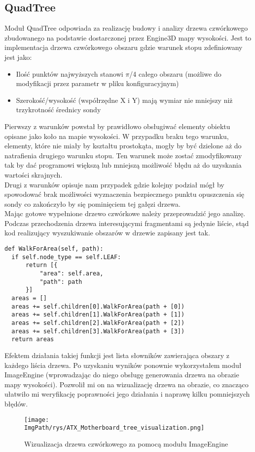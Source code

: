 \documentclass[a4paper,12pt,twoside,openany]{report}
\newcommand{\ImgPath}{.}
\begin{document}
    \subsection{QuadTree}
      Moduł QuadTree odpowiada za realizację budowy i analizy drzewa czwórkowego zbudowanego na podstawie dostarczonej przez 
      Engine3D mapy wysokości. Jest to implementacja drzewa czwórkowego obszaru gdzie warunek stopu zdefiniowany jest jako: 
      \begin{itemize}
        \item Ilość punktów najwyższych stanowi $\pi$/4 całego obszaru (możliwe do modyfikacji przez parametr w pliku konfiguracyjnym)
        \item Szerokość/wysokość (współrzędne X i Y) mają wymiar nie mniejszy niż trzykrotność średnicy sondy
      \end{itemize}
      Pierwszy z warunków powstał by prawidłowo obsługiwać elementy obiektu opisane jako koło na mapie wysokości. W przypadku braku tego warunku, 
      elementy, które nie miały by kształtu prostokąta, mogły by być dzielone aż do natrafienia drugiego warunku stopu. Ten warunek może zostać 
      zmodyfikowany tak by dać programowi większą lub mniejszą możliwość błędu aż do uzyskania wartości skrajnych.\\
      Drugi z warunków opisuje nam przypadek gdzie kolejny podział mógł by spowodować brak możliwości wyznaczenia bezpiecznego punktu opuszczenia 
      się sondy co zakończyło by się pominięciem tej gałęzi drzewa.\\
      Mając gotowe wypełnione drzewo czwórkowe należy przeprowadzić jego analizę. Podczas przechodzenia drzewa interesującymi fragmentami są jedynie liście, 
      stąd kod realizujący wyszukiwanie obszarów w drzewie zapisany jest tak.
      \begin{lstlisting}
def WalkForArea(self, path):
  if self.node_type == self.LEAF:
      return [{
          "area": self.area,
          "path": path
      }]
  areas = []
  areas += self.children[0].WalkForArea(path + [0])
  areas += self.children[1].WalkForArea(path + [1])
  areas += self.children[2].WalkForArea(path + [2])
  areas += self.children[3].WalkForArea(path + [3])
  return areas
      \end{lstlisting}
      Efektem działania takiej funkcji jest lista słowników zawierająca obszary z każdego liścia drzewa. Po uzyskaniu wyników ponownie wykorzystałem 
      moduł ImageEngine (wprowadzając do niego obsługę generowania drzewa na obrazie mapy wysokości). Pozwolił mi on na wizualizację drzewa na obrazie, 
      co znacząco ułatwiło mi weryfikację poprawności jego działania i naprawę kilku pomniejszych błędów.
      \begin{figure}[!htbp]
        \begin{center}
      \centering
      \texttt{[image: \\ImgPath/rys/ATX\_Motherboard\_tree\_visualization.png]}
      \end{center}
        \caption{Wizualizacja drzewa czwórkowego za pomocą modułu ImageEngine}
        \label{ATXtmap}
      \end{figure}
      \clearpage
\end{document}
